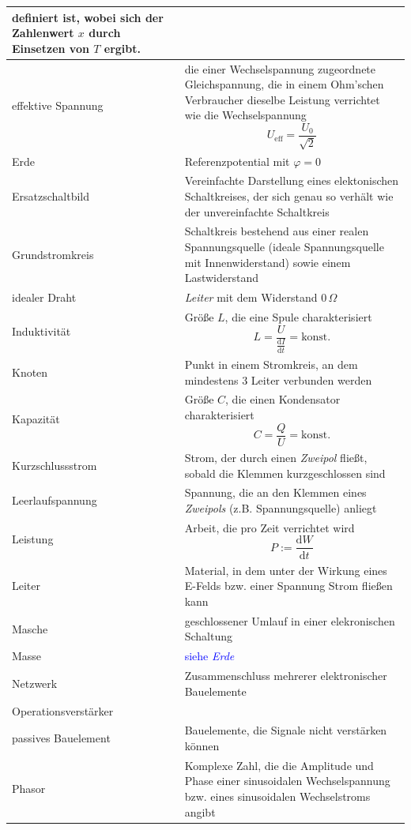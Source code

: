 \documentclass{article}
\newcommand{\diff}{\mathrm{d}}
\begin{document}
\begin{xltabular}{\linewidth}{p{6cm}|X}
		definiert ist, wobei sich der Zahlenwert $x$ durch Einsetzen von $T$ ergibt. \\
	\hline
		effektive Spannung & die einer Wechselspannung zugeordnete Gleichspannung, die in einem Ohm'schen Verbraucher dieselbe Leistung verrichtet wie die Wechselspannung
			$$U_\text{eff} = \frac{U_0}{\sqrt{2}}$$ \\
	\hline
		Erde & Referenzpotential mit $\varphi=0$ \\
	\hline
		Ersatzschaltbild & Vereinfachte Darstellung eines elektonischen Schaltkreises, der sich genau so verhält wie der unvereinfachte Schaltkreis \\
	\hline
		Grundstromkreis & Schaltkreis bestehend aus einer realen Spannungsquelle (ideale Spannungsquelle mit Innenwiderstand) sowie einem Lastwiderstand \\
	\hline
		idealer Draht & \textit{Leiter} mit dem Widerstand $0 \, \Omega$ \\
	\hline
		Induktivität & Größe $L$, die eine Spule charakterisiert
			$$L = \frac{U}{\frac{\diff I}{\diff t}} = \text{konst.}$$ \\
	\hline
		Knoten & Punkt in einem Stromkreis, an dem mindestens 3 Leiter verbunden werden \\
	\hline
		Kapazität & Größe $C$, die einen Kondensator charakterisiert
			$$C = \frac{Q}{U} = \text{konst.}$$ \\
	\hline
		Kurzschlussstrom & Strom, der durch einen \textit{Zweipol} fließt, sobald die Klemmen kurzgeschlossen sind \\
	\hline
		Leerlaufspannung & Spannung, die an den Klemmen eines \textit{Zweipols} (z.B. Spannungsquelle) anliegt \\
	\hline
		Leistung & Arbeit, die pro Zeit verrichtet wird
			$$P := \frac{\diff W}{\diff t}$$ \\
	\hline
		Leiter & Material, in dem unter der Wirkung eines E-Felds bzw. einer Spannung Strom fließen kann \\
	\hline
		Masche & geschlossener Umlauf in einer elekronischen Schaltung \\
	\hline
		Masse & \textcolor{blue}{siehe \textit{Erde}} \\
	\hline
		Netzwerk & Zusammenschluss mehrerer elektronischer Bauelemente \\
	\hline
		Operationsverstärker &  \\
	\hline
		passives Bauelement & Bauelemente, die Signale nicht verstärken können \\
	\hline
		Phasor & Komplexe Zahl, die die Amplitude und Phase einer sinusoidalen Wechselspannung bzw. eines sinusoidalen Wechselstroms angibt \\

\end{xltabular}
\end{document}
